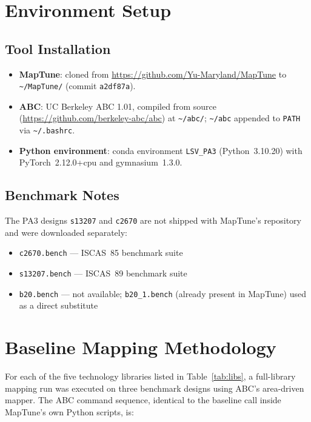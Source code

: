 \documentclass[12pt, a4paper]{report}
\begin{document}
\section{Environment Setup}

\subsection{Tool Installation}

\begin{itemize}[noitemsep]
  \item \textbf{MapTune}: cloned from
        \url{https://github.com/Yu-Maryland/MapTune} to \texttt{\textasciitilde/MapTune/}
        (commit \texttt{a2df87a}).
  \item \textbf{ABC}: UC Berkeley ABC 1.01, compiled from source
        (\url{https://github.com/berkeley-abc/abc}) at \texttt{\textasciitilde/abc/};
        \texttt{\textasciitilde/abc} appended to \texttt{PATH} via \texttt{\textasciitilde/.bashrc}.
  \item \textbf{Python environment}: conda environment \texttt{LSV\_PA3}
        (Python~3.10.20) with PyTorch~2.12.0+cpu and gymnasium~1.3.0.
\end{itemize}

\subsection{Benchmark Notes}

The PA3 designs \texttt{s13207} and \texttt{c2670} are not shipped with MapTune's
repository and were downloaded separately:

\begin{itemize}[noitemsep]
  \item \texttt{c2670.bench} --- ISCAS~85 benchmark suite
  \item \texttt{s13207.bench} --- ISCAS~89 benchmark suite
  \item \texttt{b20.bench} --- not available; \texttt{b20\_1.bench}
        (already present in MapTune) used as a direct substitute
\end{itemize}

\section{Baseline Mapping Methodology}

For each of the five technology libraries listed in Table~\ref{tab:libs},
a full-library mapping run was executed on three benchmark designs using ABC's
area-driven mapper.
The ABC command sequence, identical to the baseline call inside MapTune's own
Python scripts, is:
\end{document}
